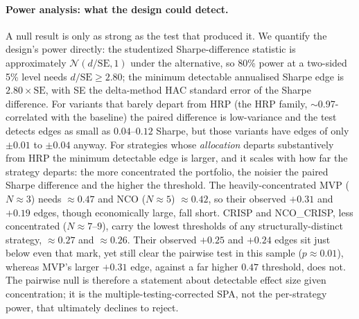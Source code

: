 \documentclass[11pt,a4paper]{article}
\begin{document}
\paragraph{Power analysis: what the design could detect.}
\label{sec:results-power}
A null result is only as strong as the test that produced it. We
quantify the design's power directly: the studentized Sharpe-difference
statistic is approximately $\mathcal{N}(d/\mathrm{SE},1)$ under the
alternative, so 80\% power at a two-sided 5\% level needs
$d/\mathrm{SE}\ge 2.80$; the minimum detectable annualised Sharpe edge
is $2.80\times\mathrm{SE}$, with SE the delta-method HAC standard error
of the Sharpe difference. For variants that barely depart from HRP
(the HRP family, $\sim$0.97-correlated with the baseline) the paired
difference is low-variance and the test detects edges as small as
$0.04$--$0.12$ Sharpe, but those variants have edges of only $\pm0.01$
to $\pm0.04$ anyway. For strategies whose \emph{allocation} departs
substantively from HRP the minimum detectable edge is larger, and it
scales with how far the strategy departs: the more concentrated the
portfolio, the noisier the paired Sharpe difference and the higher the
threshold. The heavily-concentrated MVP ($N\approx3$) needs
$\approx0.47$ and NCO ($N\approx5$) $\approx0.42$, so their observed
$+0.31$ and $+0.19$ edges, though economically large, fall short.
CRISP and NCO\_CRISP, less concentrated ($N\approx7$--$9$), carry the
lowest thresholds of any structurally-distinct strategy, $\approx0.27$
and $\approx0.26$. Their observed $+0.25$ and $+0.24$ edges sit just
below even that mark, yet still clear the pairwise test in this sample
($p\approx0.01$), whereas MVP's larger $+0.31$ edge, against a far
higher $0.47$ threshold, does not.
The pairwise null is therefore a statement about detectable effect
size given concentration; it is the multiple-testing-corrected SPA,
not the per-strategy power, that ultimately declines to reject.
\end{document}

